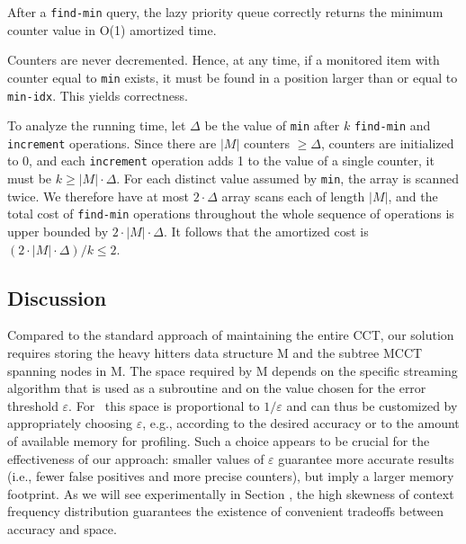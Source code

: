 \ifauthorea{\newline}{}
\begin{theorem}
After a {\tt find-min} query, the lazy priority queue correctly returns the minimum counter value in O(1) amortized time.
\end{theorem}
\begin{myproof} Counters are never decremented. Hence, at any time, if a monitored item with counter equal to {\tt min} exists, it must be found in a position larger than or equal to {\tt min-idx}. This yields correctness.

To analyze the running time, let $\Delta$ be the value of {\tt min} after $k$ {\tt find-min} and {\tt increment} operations. Since there are $|M|$ counters $\ge\Delta$, counters are initialized to $0$, and each {\tt increment} operation adds 1 to the value of a single counter, it must be $k\ge |M|\cdot\Delta$. For each distinct value assumed by {\tt min}, the array is scanned twice. We therefore have at most $2\cdot\Delta$ array scans each of length $|M|$, and the total cost of {\tt find-min} operations throughout the whole sequence of operations is upper bounded by $2\cdot|M|\cdot\Delta$. It follows that the amortized cost is $(2\cdot|M|\cdot\Delta)/k\leq 2$.
\end{myproof}

\subsection{Discussion}

Compared to the standard approach of maintaining the entire CCT, our solution requires storing the heavy hitters data structure M and the subtree MCCT spanning nodes in M. The space required by M depends on the specific streaming algorithm that is used as a subroutine and on the value chosen for the error threshold $\varepsilon$. For \spacesaving\, this space is proportional to $1/\varepsilon$ and can thus be customized by appropriately choosing $\varepsilon$, e.g., according to the desired accuracy or to the amount of available memory for profiling. Such a choice appears to be crucial for the effectiveness of our approach: smaller values of $\varepsilon$ guarantee more accurate results (i.e., fewer false positives and more precise counters), but imply a larger memory footprint. As we will see experimentally in Section \missing, the high skewness of context frequency distribution guarantees the existence of convenient tradeoffs between accuracy and space.

